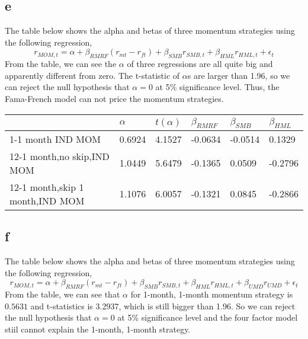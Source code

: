 \documentclass{report}
\begin{document}
\subsection{e}
The table below shows the alpha and betas of three momentum strategies using the following regression,
\[ r_{MOM,t} = \alpha + \beta_{RMRF}( r_{mt}-r_{ft}) + \beta_{SMB} r_{SMB,t} + \beta_{HML} r_{HML,t} + \epsilon_{t} \]
From the table, we can see the $\alpha$ of three regressions are all quite big and apparently different from zero. The t-statistic of $\alpha$s are larger than 1.96, so we can reject the null hypothesis that $\alpha = 0$ at 5\% significance level.  Thus, the Fama-French model can not price the momentum strategies.
\begin{table}[H]
\centering
\begin{tabular}{|l|l|l|l|l|l|}
\hline
                           & $\alpha$  & $t(\alpha)$ & $\beta_{RMRF}$    & $\beta_{SMB}$     & $\beta_{HML}$     \\ \hline
1-1 month IND MOM          & 0.6924 & 4.1527 & -0.0634 & -0.0514 & 0.1329  \\ \hline
12-1 month,no skip,IND MOM & 1.0449 & 5.6479 & -0.1365 & 0.0509  & -0.2796 \\ \hline
12-1 month,skip 1 month,IND MOM    & 1.1076 & 6.0057 & -0.1321 & 0.0845  & -0.2866 \\ \hline
\end{tabular}
\end{table}

\subsection{f}
The table below shows the alpha and betas of three momentum strategies using the following regression,
\[ r_{MOM,t} = \alpha + \beta_{RMRF}( r_{mt}-r_{ft}) + \beta_{SMB} r_{SMB,t} + \beta_{HML} r_{HML,t} + \beta_{UMD} r_{UMD}+ \epsilon_{t} \]
From the table, we can see that $\alpha$ for 1-month, 1-month momentum strategy is $0.5631$ and t-statistics is 3.2937, which is  still bigger than 1.96. So we can reject the null hypothesis that $\alpha = 0$ at 5\% significance level and the four factor model stiil cannot explain the 1-month, 1-month strategy. 
\end{document}
